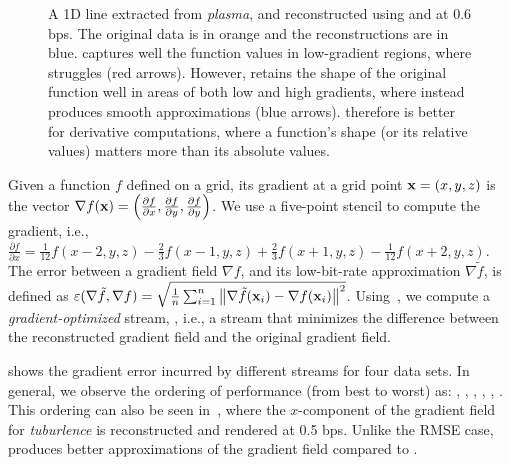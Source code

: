\begin{figure}[h]
\centering
{}
\caption{A 1D line extracted from \emph{plasma}, and reconstructed using \sbit and \swav at 0.6 bps.
The original data is in orange and the reconstructions are in blue. \swav captures well the function
values in low-gradient regions, where \sbit struggles (red arrows). However, \sbit retains the shape
of the original function well in areas of both low and high gradients, where \swav instead produces
smooth approximations (blue arrows). \sbit therefore is better for derivative computations, where a
function's shape (or its relative values) matters more than its absolute values.}
\label{fig:bit-plane-vs-wavelet-norm-gradient}
\end{figure}

Given a function $f$ defined on a grid, its gradient at a grid point \mbox{$\x = (x,y,z)$} is the
vector $\nabla f(\x) = \left(\frac{\partial f}{\partial x}, \frac{\partial f}{\partial y},
\frac{\partial f}{\partial y}\right)$. We use a five-point stencil to compute the gradient, i.e.,
$\frac{\partial f}{\partial x} = \frac{1}{12}f(x-2,y,z) - \frac{2}{3}f(x-1,y,z) +
\frac{2}{3}f(x+1,y,z) - \frac{1}{12}f(x+2,y,z)$. The error between a gradient field $\nabla f$, and
its low-bit-rate approximation $\nabla
\tilde{f}$, is defined as $\err(\nabla \tilde{f}, \nabla f) = \sqrt{\frac{1}{n}
\sum_{i=1}^{n}{\norm{\nabla \tilde{f}(\x_i)-\nabla f(\x_i)}^2}}$. Using~, we
compute a \emph{gradient-optimized} stream, \sgop, i.e., a stream that minimizes the difference
between the reconstructed gradient field and the original gradient field.

 shows the gradient error incurred by different streams for four
data sets. In general, we observe the ordering of performance (from best to worst) as: \sgop, \sgsg,
\sbit, \swav, \smag, \slvl. This ordering can also be seen in~,
where the $x$-component of the gradient field for \emph{tuburlence} is reconstructed and rendered at
0.5 bps. Unlike the RMSE case, \sbit produces better approximations of the gradient field compared
to \swav.

